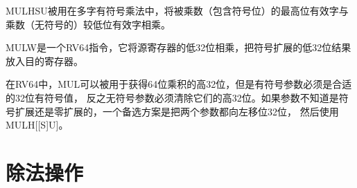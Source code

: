 
\begin{commentary}
  MULHSU被用在多字有符号乘法中，将被乘数（包含符号位）的最高位有效字与乘数（无符号的）较低位有效字相乘。
\end{commentary}

MULW是一个RV64指令，它将源寄存器的低32位相乘，把符号扩展的低32位结果放入目的寄存器。

\begin{commentary}
  在RV64中，MUL可以被用于获得64位乘积的高32位，但是有符号参数必须是合适的32位有符号值，
  反之无符号参数必须清除它们的高32位。如果参数不知道是符号扩展还是零扩展的，一个备选方案是把两个参数都向左移位32位，
  然后使用MULH[[S]U]。
\end{commentary}

\section{除法操作
  }

